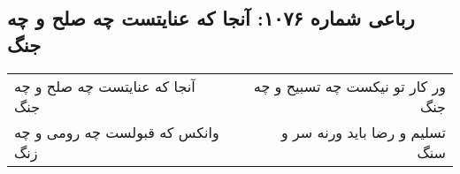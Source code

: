 \begin{center}
\section*{رباعی شماره ۱۰۷۶: آنجا که عنایتست چه صلح و چه جنگ}
\label{sec:1076}
\begin{longtable}{l p{0.5cm} r}
آنجا که عنایتست چه صلح و چه جنگ
&&
ور کار تو نیکست چه تسبیح و چه جنگ
\\
وانکس که قبولست چه رومی و چه زنگ
&&
تسلیم و رضا باید ورنه سر و سنگ
\\
\end{longtable}
\end{center}

